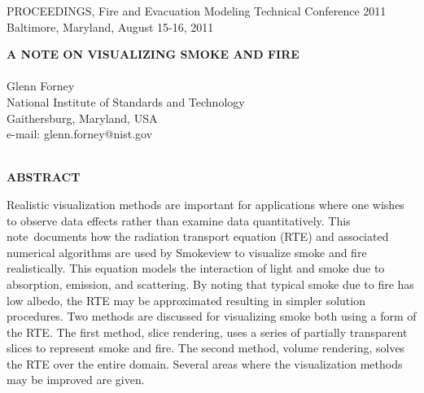 \documentclass[10pt]{article}
\newcommand{\paper}{note}
\begin{document}



\pagestyle{plain}

%
%
\newcommand{\hhref}[1]{\href{#1}{{\tt #1}}}

\doublespace

\pagestyle{empty} 
%
%

\newpage

PROCEEDINGS, Fire and Evacuation Modeling Technical Conference 2011 \\
Baltimore, Maryland, August 15-16, 2011

\begin{center}
{\bf A NOTE ON VISUALIZING SMOKE AND FIRE} \\
\hspace{1in} \\
Glenn Forney \\
National Institute of Standards and Technology \\
Gaithersburg, Maryland, USA \\
e-mail: glenn.forney@nist.gov \\
\hspace{1in} \\
\end{center}
\begin{center}
{\bf ABSTRACT}\\
\end{center}

Realistic visualization methods are important for applications where one wishes to observe data effects rather than examine data quantitatively.  This \paper\ documents how the radiation transport equation (RTE) and associated numerical algorithms are used by Smokeview to visualize smoke and fire realistically.  This equation models the interaction of light and smoke due to absorption, emission, and scattering.  By noting that typical smoke due to fire has low albedo, the RTE may be approximated resulting in simpler solution procedures. Two methods are discussed for visualizing smoke both using a form of the RTE.  The first method, slice rendering,  uses a series of partially transparent slices to represent smoke and fire. The second method, volume rendering, solves the RTE over the entire domain. Several areas where the visualization methods may be improved are given.

%
%



%
%
\newpage


\end{document}
